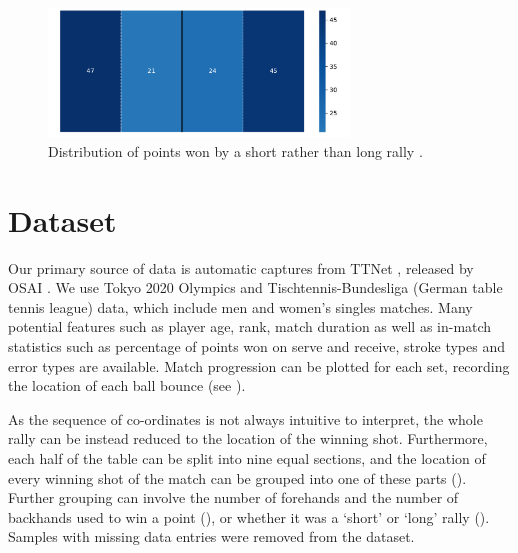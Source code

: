 \begin{figure}[ht]
\centering

\includegraphics[width=8cm]{plots/shortvslongrally.pdf}
\caption{Distribution of points won by a short rather than long rally \cite{OSAI}.}

\label{fig:svlr}
\end{figure}

\section{Dataset} \label{sec:dataset}
Our primary source of data is automatic captures from TTNet \cite{voeikov2020ttnet}, released by OSAI \cite{OSAI}. We use Tokyo 2020 Olympics and Tischtennis-Bundesliga (German table tennis league) data, which include men and women's singles matches. Many potential features such as player age, rank, match duration as well as in-match statistics such as percentage of points won on serve and receive, stroke types and error types are available. Match progression can be plotted for each set, recording the location of each ball bounce (see ).


As the sequence of co-ordinates is not always intuitive to interpret, the whole rally can be instead reduced to the location of the winning shot. Furthermore, each half of the table can be split into nine equal sections, and the location of every winning shot of the match can be grouped into one of these parts (). Further grouping can involve the number of forehands and the number of backhands used to win a point (), or whether it was a `short' or `long' rally (). %
Samples with missing data entries were removed from the dataset.

 
